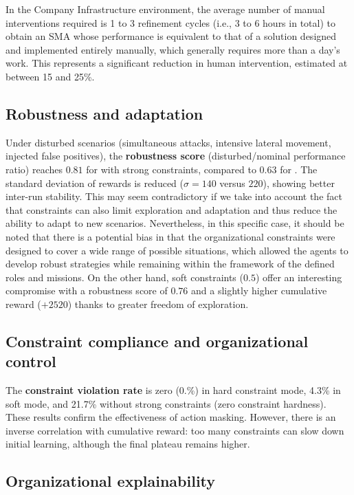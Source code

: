 In the Company Infrastructure environment, the average number of manual interventions required is 1 to 3 refinement cycles (i.e., 3 to 6 hours in total) to obtain an SMA whose performance is equivalent to that of a solution designed and implemented entirely manually, which generally requires more than a day's work. This represents a significant reduction in human intervention, estimated at between 15 and 25\%.

\subsection*{Robustness and adaptation}

Under disturbed scenarios (simultaneous attacks, intensive lateral movement, injected false positives), the \textbf{robustness score} (disturbed/nominal performance ratio) reaches $0.81$ for  with strong constraints, compared to $0.63$ for .
The standard deviation of rewards is reduced ($\sigma = 140$ versus $220$), showing better inter-run stability. This may seem contradictory if we take into account the fact that constraints can also limit exploration and adaptation and thus reduce the ability to adapt to new scenarios. Nevertheless, in this specific case, it should be noted that there is a potential bias in that the organizational constraints were designed to cover a wide range of possible situations, which allowed the agents to develop robust strategies while remaining within the framework of the defined roles and missions.
On the other hand, soft constraints ($0.5$) offer an interesting compromise with a robustness score of $0.76$ and a slightly higher cumulative reward ($+2520$) thanks to greater freedom of exploration.

\subsection*{Constraint compliance and organizational control}

The \textbf{constraint violation rate} is zero (0.\%) in hard constraint mode, 4.3\% in soft mode, and 21.7\% without strong constraints (zero constraint hardness).
These results confirm the effectiveness of action masking.
However, there is an inverse correlation with cumulative reward: too many constraints can slow down initial learning, although the final plateau remains higher.

\subsection*{Organizational explainability}

